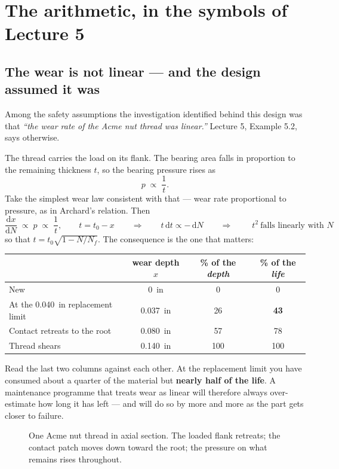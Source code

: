 \documentclass[11pt,a4paper]{article}
\begin{document}
\section{The arithmetic, in the symbols of Lecture 5}

\subsection{The wear is not linear --- and the design assumed it was}

Among the safety assumptions the investigation identified behind this design was that
\emph{``the wear rate of the Acme nut thread was linear.''} Lecture 5, Example 5.2, says otherwise.

\medskip
The thread carries the load on its flank. The bearing area falls in proportion to the remaining
thickness $t$, so the bearing pressure rises as
\[
p \;\propto\; \frac{1}{t}.
\]
Take the simplest wear law consistent with that --- wear rate proportional to pressure, as in
Archard's relation. Then
\[
\frac{\mathrm{d}x}{\mathrm{d}N}\;\propto\;p\;\propto\;\frac{1}{t},
\qquad t = t_0 - x
\qquad\Longrightarrow\qquad
t\,\mathrm{d}t \propto -\,\mathrm{d}N
\qquad\Longrightarrow\qquad
\boxed{\;t^{2}\ \text{falls linearly with }N\;}
\]
so that $t = t_0\sqrt{1 - N/N_f}$. The consequence is the one that matters:

\begin{center}\small
\begin{tabular}{@{}lccc@{}}
\toprule
 & wear depth $x$ & \% of the \emph{depth} & \% of the \emph{life}\\
\midrule
New & \SI{0}{in} & 0 & 0\\
At the \SI{0.040}{in} replacement limit & \SI{0.037}{in} & 26 & \textbf{43}\\
Contact retreats to the root & \SI{0.080}{in} & 57 & 78\\
Thread shears & \SI{0.140}{in} & 100 & 100\\
\bottomrule
\end{tabular}
\end{center}

\medskip
Read the last two columns against each other. At the replacement limit you have consumed about a
quarter of the material but \textbf{nearly half of the life}. A maintenance programme that treats
wear as linear will therefore always over-estimate how long it has left --- and will do so by more
and more as the part gets closer to failure.

\begin{figure}[H]\centering
\resizebox{\textwidth}{!}{}
\caption{One Acme nut thread in axial section. The loaded flank retreats; the contact patch moves
down toward the root; the pressure on what remains rises throughout.}
\label{fig:wear}
\end{figure}
\end{document}
